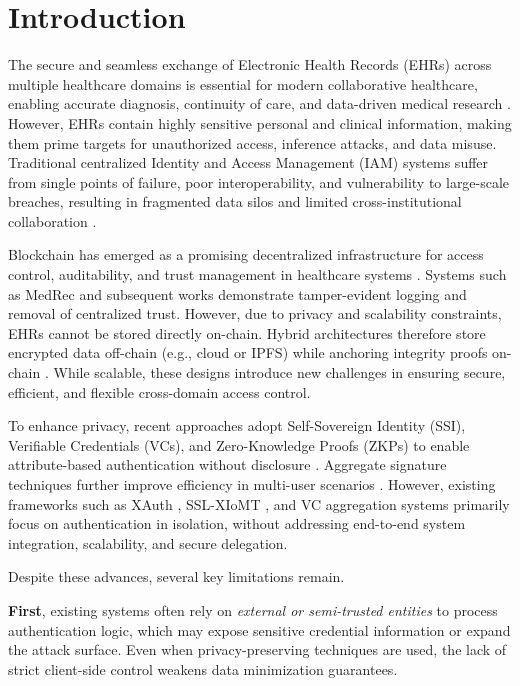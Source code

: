 \documentclass[conference]{IEEEtran}
\begin{document}
\section{Introduction}

The secure and seamless exchange of Electronic Health Records (EHRs) across multiple healthcare domains is essential for modern collaborative healthcare, enabling accurate diagnosis, continuity of care, and data-driven medical research \cite{b1,b2}. However, EHRs contain highly sensitive personal and clinical information, making them prime targets for unauthorized access, inference attacks, and data misuse. Traditional centralized Identity and Access Management (IAM) systems suffer from single points of failure, poor interoperability, and vulnerability to large-scale breaches, resulting in fragmented data silos and limited cross-institutional collaboration \cite{b3,b4}.

Blockchain has emerged as a promising decentralized infrastructure for access control, auditability, and trust management in healthcare systems \cite{b6,b7}. Systems such as MedRec \cite{b1} and subsequent works \cite{b2,b3,b5} demonstrate tamper-evident logging and removal of centralized trust. However, due to privacy and scalability constraints, EHRs cannot be stored directly on-chain. Hybrid architectures therefore store encrypted data off-chain (e.g., cloud or IPFS) while anchoring integrity proofs on-chain \cite{b11,b12}. While scalable, these designs introduce new challenges in ensuring secure, efficient, and flexible cross-domain access control.

To enhance privacy, recent approaches adopt Self-Sovereign Identity (SSI), Verifiable Credentials (VCs), and Zero-Knowledge Proofs (ZKPs) to enable attribute-based authentication without disclosure \cite{b8,b9}. Aggregate signature techniques further improve efficiency in multi-user scenarios \cite{b10}. However, existing frameworks such as XAuth \cite{b6}, SSL-XIoMT \cite{b8}, and VC aggregation systems \cite{b9} primarily focus on authentication in isolation, without addressing end-to-end system integration, scalability, and secure delegation.

Despite these advances, several key limitations remain.

\textbf{First}, existing systems often rely on \emph{external or semi-trusted entities} to process authentication logic, which may expose sensitive credential information or expand the attack surface. Even when privacy-preserving techniques are used, the lack of strict client-side control weakens data minimization guarantees.
\end{document}
